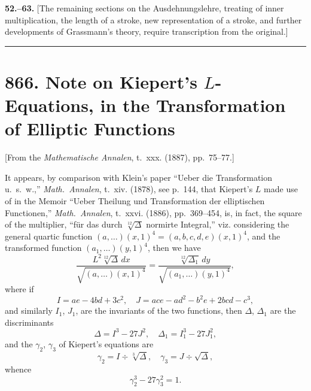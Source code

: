 \documentclass[11pt,a4paper]{article}
\theoremstyle{definition}
\begin{document}
\textbf{52.--63.} [The remaining sections on the Ausdehnungslehre, treating of inner multiplication, the length of a stroke, new representation of a stroke, and further developments of Grassmann's theory, require transcription from the original.]

\vspace{12pt}
\hrule
\vspace{12pt}

\section*{866. Note on Kiepert's $L$-Equations, in the Transformation of Elliptic Functions}

\begin{center}
[From the \textit{Mathematische Annalen}, t.~xxx. (1887), pp.~75--77.]
\end{center}

It appears, by comparison with Klein's paper ``Ueber die Transformation u.~s.~w.,'' \textit{Math.~Annalen}, t.~xiv. (1878), see p.~144, that Kiepert's $L$ made use of in the Memoir ``Ueber Theilung und Transformation der elliptischen Functionen,'' \textit{Math.~Annalen}, t.~xxvi. (1886), pp.~369--454, is, in fact, the square of the multiplier, ``f\"ur das durch $\sqrt[12]{\Delta}$ normirte Integral,'' viz. considering the general quartic function $(a, \ldots)(x, 1)^4 = (a, b, c, d, e)(x, 1)^4$, and the transformed function $(a_1, \ldots)(y, 1)^4$, then we have
\[
\frac{L^2 \sqrt[12]{\Delta}\, dx}{\sqrt{(a, \ldots)(x, 1)^4}} = \frac{\sqrt[12]{\Delta_1}\, dy}{\sqrt{(a_1, \ldots)(y, 1)^4}},
\]
where if
\[I = ae - 4bd + 3c^2, \quad J = ace - ad^2 - b^2e + 2bcd - c^3,\]
and similarly $I_1$, $J_1$, are the invariants of the two functions, then $\Delta$, $\Delta_1$ are the discriminants
\[\Delta = I^3 - 27J^2, \quad \Delta_1 = I_1^3 - 27J_1^2,\]
and the $\gamma_2$, $\gamma_3$ of Kiepert's equations are
\[\gamma_2 = I \div \sqrt[3]{\Delta}, \quad \gamma_3 = J \div \sqrt{\Delta},\]
whence
\[\gamma_2^3 - 27\gamma_3^2 = 1.\]
\end{document}
